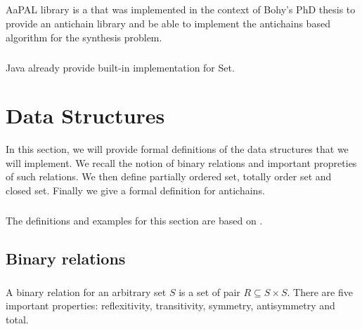 \documentclass[letterpaper]{memoir}
\begin{document}
\paragraph{}

AaPAL library is a that was implemented in the context of Bohy's PhD thesis
to provide an antichain library and be able to implement the antichains
based algorithm for the synthesis problem.

\paragraph{}

Java already provide built-in implementation for Set.

\chapter{Data Structures}

In this section, we will provide formal definitions of the data
structures that we will implement. We recall the notion of binary relations
and important propreties of such relations.
We then define partially ordered set, totally order set and closed set.
Finally we give a formal definition for antichains.

\paragraph{}

The definitions and examples for this section are based on \cite{bohy_phd}.


\section{Binary relations}

\paragraph{}

A binary relation for an arbitrary set $S$ is
a set of pair $R \subseteq S \times S$.
There are five important properties: reflexitivity, transitivity,
symmetry, antisymmetry and total.

\paragraph{}
\end{document}
